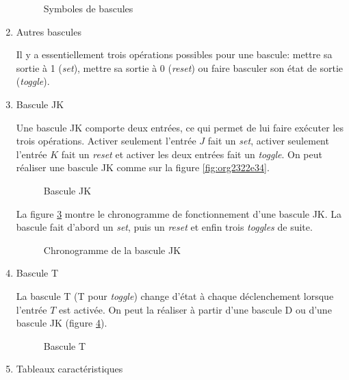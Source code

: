 \documentclass[letter, oneside]{book}
\begin{document}
\begin{enumerate}
\begin{figure}[htbp]
\centering

\caption{\label{fig:orgeeb0a03}Symboles de bascules}
\end{figure}

\item Autres bascules
\label{sec:org95f9b4e}

Il y a essentiellement trois opérations possibles pour une bascule:
mettre sa sortie à 1 (\emph{set}), mettre sa sortie à 0 (\emph{reset}) ou faire
basculer son état de sortie (\emph{toggle}).

\item Bascule JK
\label{sec:orga051235}

Une bascule JK comporte deux entrées, ce qui permet de lui faire
exécuter les trois opérations. Activer seulement l'entrée \(J\) fait
un \emph{set}, activer seulement l'entrée \(K\) fait un \emph{reset} et activer
les deux entrées fait un \emph{toggle}. On peut réaliser une bascule JK
comme sur la figure \ref{fig:org2322e34}.

\begin{figure}[htbp]
\centering

\caption{\label{fig:org3ec2e67}Bascule JK}
\end{figure}

La figure \ref{fig:orgf0f5e33} montre le chronogramme de fonctionnement
d'une bascule JK. La bascule fait d'abord un \emph{set}, puis un \emph{reset} et
enfin trois \emph{toggles} de suite.

\begin{figure}[htbp]
\centering

\caption{\label{fig:orgf0f5e33}Chronogramme de la bascule JK}
\end{figure}

\item Bascule T
\label{sec:org10b3f8b}

La bascule T (T pour \emph{toggle}) change d'état à chaque déclenchement
lorsque l'entrée \(T\) est activée. On peut la réaliser à partir d'une
bascule D ou d'une bascule JK (figure \ref{fig:org3b09036}).

\begin{figure}[htbp]
\centering

\caption{\label{fig:org3b09036}Bascule T}
\end{figure}

\item Tableaux caractéristiques
\label{sec:org624f622}


\end{enumerate}
\end{document}
